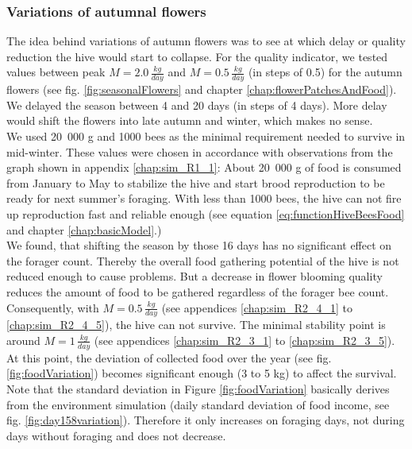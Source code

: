 	\subsubsection{Variations of autumnal flowers}
		\label{chap:variationsOnAutumnFlowers}
		The idea behind variations of autumn flowers was to see at which delay or quality reduction the hive would start to collapse. For the quality indicator, we tested values between peak $M = 2.0\,\frac{kg}{day}$ and $M = 0.5\,\frac{kg}{day}$ (in steps of 0.5) for the autumn flowers (see fig. \ref{fig:seasonalFlowers} and chapter \ref{chap:flowerPatchesAndFood}). We delayed the season between 4 and 20 days (in steps of 4 days). More delay would shift the flowers into late autumn and winter, which makes no sense.\\
		We used 20~000 g and 1000 bees as the minimal requirement needed to survive in mid-winter. These values were chosen in accordance with observations from the graph shown in appendix \ref{chap:sim_R1_1}: About 20~000 g of food is consumed from January to May to stabilize the hive and start brood reproduction to be ready for next summer's foraging. With less than 1000 bees, the hive can not fire up reproduction fast and reliable enough (see equation \ref{eq:functionHiveBeesFood} and chapter \ref{chap:basicModel}.)\\
		We found, that shifting the season by those 16 days has no significant effect on the forager count. Thereby the overall food gathering potential of the hive is not reduced enough to cause problems. But a decrease in flower blooming quality reduces the amount of food to be gathered regardless of the forager bee count. Consequently, with $M = 0.5\,\frac{kg}{day}$ (see appendices \ref{chap:sim_R2_4_1} to \ref{chap:sim_R2_4_5}), the hive can not survive. The minimal stability point is around $M = 1\,\frac{kg}{day}$ (see appendices \ref{chap:sim_R2_3_1} to \ref{chap:sim_R2_3_5}). At this point, the deviation of collected food over the year (see fig. \ref{fig:foodVariation}) becomes significant enough (3 to 5 kg) to affect the survival.\\
		
		Note that the standard deviation in Figure \ref{fig:foodVariation} basically derives  from the environment simulation (daily standard deviation of food income, see fig. \ref{fig:day158variation}). Therefore it only increases on foraging days, not during days without foraging and does not decrease.
		
